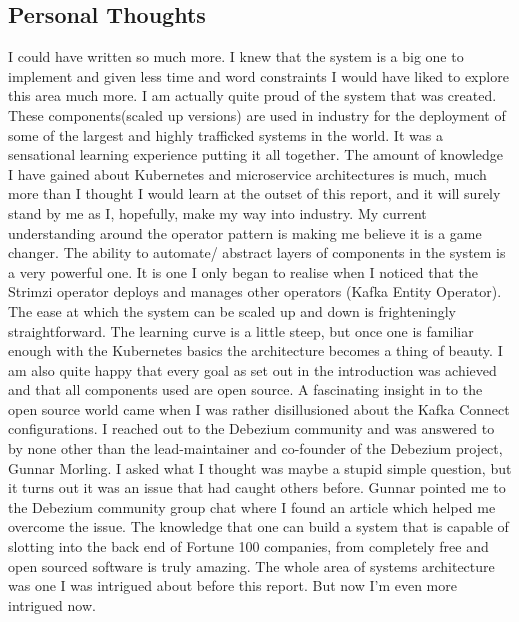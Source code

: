 \begin{flushleft}
	\section{Personal Thoughts}
	I could have written so much more. I knew that the system is a big one to implement and given less time and word constraints I would
	have liked to explore this area much more.\newline
	I am actually quite proud of the system that was created. These components(scaled up versions) are used in industry for the deployment
	of some of the largest and highly trafficked systems in the world. It was a sensational learning experience putting it all together.
	\bigbreak
	The amount of knowledge I have gained about Kubernetes and microservice architectures is much, much more than I thought I would learn at the
	outset of this report, and it will surely stand by me as I, hopefully, make my way into industry.\newline
	My current understanding around the operator pattern is making me believe it is a game changer. The ability to automate/ abstract layers
	of components in the system is a very powerful one. It is one I only began to realise when I noticed that the Strimzi operator deploys
	and manages other operators (Kafka Entity Operator). The ease at which the system can be scaled up and down is frighteningly straightforward.
	The learning curve is a little steep, but once one is familiar enough with the Kubernetes basics the architecture becomes a thing of beauty.
	\bigbreak
	I am also quite happy that every goal as set out in the introduction was achieved and that all components used are open source.
	A fascinating insight in to the open source world came when I was rather disillusioned about the Kafka Connect configurations. I reached out to the
	Debezium community and was answered to by none other than the lead-maintainer and co-founder of the Debezium project, Gunnar Morling. I asked
	what I thought was maybe a stupid simple question, but it turns out it was an issue that had caught others before. Gunnar pointed me to
	the Debezium community group chat where I found an article which helped me overcome the issue.\newline
	The knowledge that one can build a system that is capable of slotting into the back end of Fortune 100 companies, from completely free
	and open sourced software is truly amazing. The whole area of systems architecture was one I was intrigued about before this report. But now
	I'm even more intrigued now.
\end{flushleft}